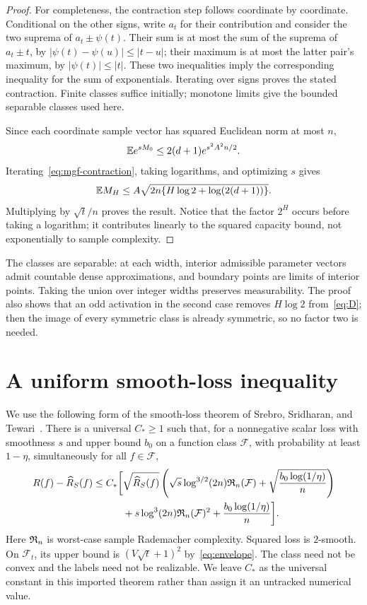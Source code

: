 \begin{proof}
For completeness, the contraction step follows coordinate by coordinate. Conditional on the other signs, write $a_t$ for their contribution and consider the two suprema of $a_t\pm\psi(t)$. Their sum is at most the sum of the suprema of $a_t\pm t$, by $|\psi(t)-\psi(u)|\le|t-u|$; their maximum is at most the latter pair's maximum, by $|\psi(t)|\le|t|$. These two inequalities imply the corresponding inequality for the sum of exponentials. Iterating over signs proves the stated contraction. Finite classes suffice initially; monotone limits give the bounded separable classes used here.

Since each coordinate sample vector has squared Euclidean norm at most $n$,
\[
 \mathbb E e^{sM_0}\le2(d+1)e^{s^2A^2n/2}.
\]
Iterating~\eqref{eq:mgf-contraction}, taking logarithms, and optimizing $s$ gives
\[
 \mathbb E M_H\le A\sqrt{2n\{H\log2+\log(2(d+1))\}}.
\]
Multiplying by $\sqrt t/n$ proves the result. Notice that the factor $2^H$ occurs before taking a logarithm; it contributes linearly to the squared capacity bound, not exponentially to sample complexity.
\end{proof}

The classes are separable: at each width, interior admissible parameter vectors admit countable dense approximations, and boundary points are limits of interior points. Taking the union over integer widths preserves measurability. The proof also shows that an odd activation in the second case removes $H\log2$ from~\eqref{eq:D}; then the image of every symmetric class is already symmetric, so no factor two is needed.

\section{A uniform smooth-loss inequality}
We use the following form of the smooth-loss theorem of Srebro, Sridharan, and Tewari~\cite[Theorem~1]{sst}. There is a universal $C_*\ge1$ such that, for a nonnegative scalar loss with smoothness $s$ and upper bound $b_0$ on a function class $\mathcal F$, with probability at least $1-\eta$, simultaneously for all $f\in\mathcal F$,
\begin{align}
 R(f)-\widehat R_S(f)\le C_*\bigg[&\sqrt{\widehat R_S(f)}
 \left(\sqrt{s}\log^{3/2}(2n)\mathfrak R_n(\mathcal F)+\sqrt{\frac{b_0\log(1/\eta)}n}\right)\notag\\
 &+s\log^3(2n)\mathfrak R_n(\mathcal F)^2+\frac{b_0\log(1/\eta)}n\bigg].
 \label{eq:sst}
\end{align}
Here $\mathfrak R_n$ is worst-case sample Rademacher complexity. Squared loss is $2$-smooth. On $\mathcal F_t$, its upper bound is $(V\sqrt t+1)^2$ by~\eqref{eq:envelope}. The class need not be convex and the labels need not be realizable. We leave $C_*$ as the universal constant in this imported theorem rather than assign it an untracked numerical value.
